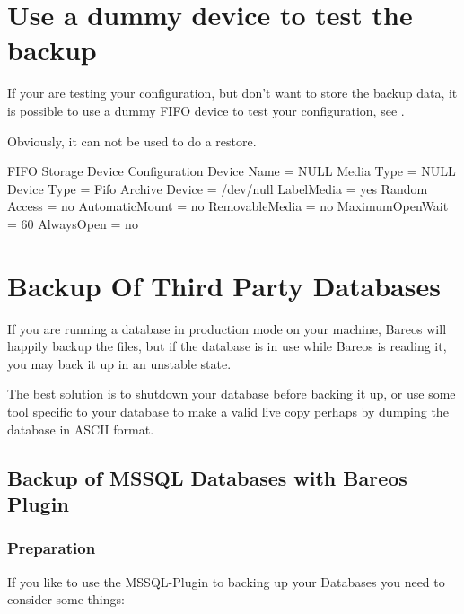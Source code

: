 
\section{Use a dummy device to test the backup}
\label{dummydevice}
\label{TestUsingFifoDevice}
If your are testing your configuration, but don't want to store the backup data,
it is possible to use a dummy FIFO device to test your configuration, see .

Obviously, it can not be used to do a restore.

\begin{bconfig}{FIFO Storage Device Configuration}
Device {
  Name = NULL
  Media Type = NULL
  Device Type = Fifo
  Archive Device = /dev/null
  LabelMedia = yes
  Random Access = no
  AutomaticMount = no
  RemovableMedia = no
  MaximumOpenWait = 60
  AlwaysOpen = no
}
\end{bconfig}



\section{Backup Of Third Party Databases}
\label{BackupOtherDBs}

If you are running a database in production mode on your machine, Bareos will
happily backup the files, but if the database is in use while Bareos is
reading it, you may back it up in an unstable state.

The best solution is to shutdown your database before backing it up, or use
some tool specific to your database to make a valid live copy perhaps by
dumping the database in ASCII format.

\subsection{Backup of MSSQL Databases with Bareos Plugin}
\label{MSSQL}


\subsubsection {Preparation}
If you like to use the MSSQL-Plugin to backing up your Databases you need to consider some things:

